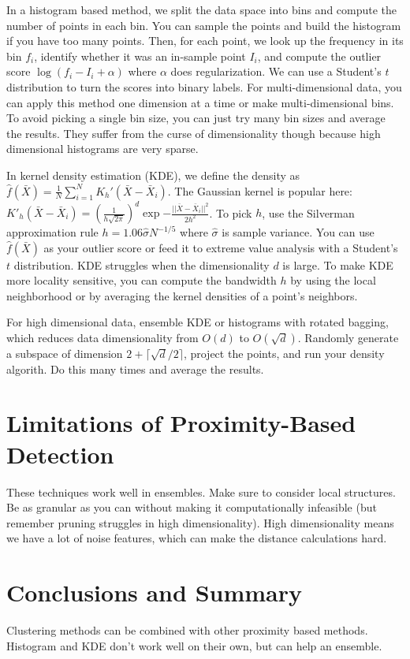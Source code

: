 \documentclass[a4paper]{article}
\begin{document}
In a histogram based method, we split the data space into bins and compute
the number of points in each bin. You can sample the points and build the
histogram if you have too many points. Then, for each point, we look up
the frequency in its bin $f_i$, identify whether it was an in-sample point
$I_i$, and compute the outlier score $\log(f_i - I_i + \alpha)$ where
$\alpha$ does regularization. We can use a Student's $t$ distribution to turn
the scores into binary labels. For multi-dimensional data, you can apply this
method one dimension at a time or make multi-dimensional bins. To avoid picking
a single bin size, you can just try many bin sizes and average the results. They
suffer from the curse of dimensionality though because high dimensional
histograms are very sparse.

In kernel density estimation (KDE), we define the density as $\hat{f}(\bar{X})
= \frac{1}{N}\sum_{i=1}^{N}{K_h'(\bar{X} - \bar{X}_i)}$. The Gaussian kernel
is popular here: $K'_h(\bar{X} - \bar{X}_i) = (\frac{1}{h \sqrt{2 \pi}})^d
\exp{-\frac{||\bar{X} - \bar{X}_i||^2}{2h^2}}$. To pick $h$, use the Silverman
approximation rule $h = 1.06\hat{\sigma}N^{-1/5}$ where $\hat{\sigma}$ is sample
variance. You can use $\hat{f}(\bar{X})$ as your outlier score or feed it to
extreme value analysis with a Student's $t$ distribution. KDE struggles when
the dimensionality $d$ is large. To make KDE more locality sensitive, you can
compute the bandwidth $h$ by using the local neighborhood or by averaging
the kernel densities of a point's neighbors.

For high dimensional data, ensemble KDE or histograms with rotated bagging,
which reduces data dimensionality from $O(d)$ to $O(\sqrt{d})$. Randomly
generate a subspace of dimension $2 + \lceil\sqrt{d}/2\rceil$, project the
points, and run your density algorith. Do this many times and average the
results.

\section{Limitations of Proximity-Based Detection}
These techniques work well in ensembles. Make sure to consider local structures.
Be as granular as you can without making it computationally infeasible (but
remember pruning struggles in high dimensionality). High dimensionality means
we have a lot of noise features, which can make the distance calculations
hard.

\section{Conclusions and Summary}
Clustering methods can be combined with other proximity based methods. Histogram
and KDE don't work well on their own, but can help an ensemble.
\end{document}
